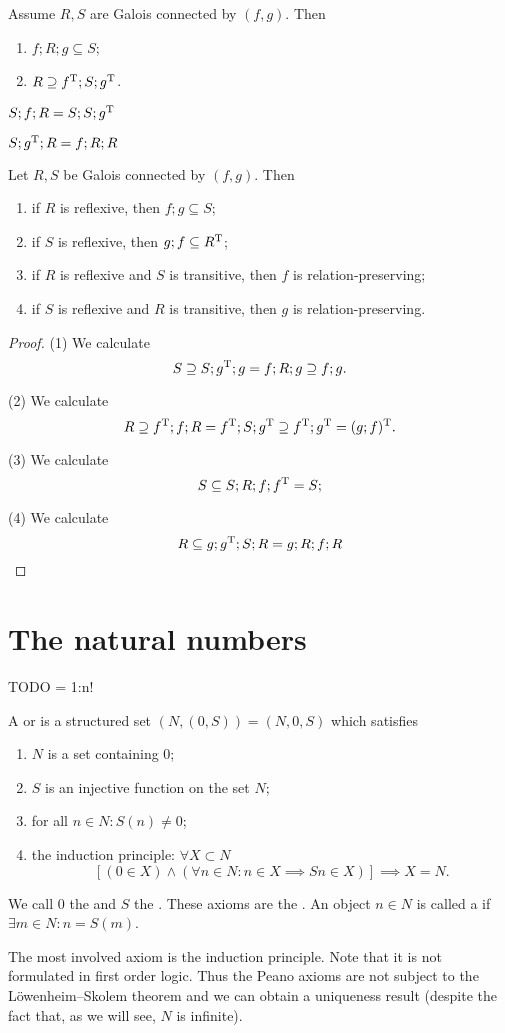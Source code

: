 \begin{corollary}
Assume $R,S$ are Galois connected by $(f,g)$. Then
\begin{enumerate}
\item $f;R;g \subseteq S$;
\item $R \supseteq f^{\mathrm{T}};S;g^{\mathrm{T}}$.
\end{enumerate}
\end{corollary}

$S;f;R = S;S;g^{\mathrm{T}}$

$S;g^{\mathrm{T}};R = f;R;R$

\begin{lemma}
Let $R, S$ be Galois connected by $(f,g)$. Then
\begin{enumerate}
\item if $R$ is reflexive, then $f;g \subseteq S$;
\item if $S$ is reflexive, then $g;f \subseteq R^{\mathrm{T}}$;
\item if $R$ is reflexive and $S$ is transitive, then $f$ is relation-preserving;
\item if $S$ is reflexive and $R$ is transitive, then $g$ is relation-preserving.
\end{enumerate}
\end{lemma}
\begin{proof}
(1) We calculate
\[ S \supseteq S;g^{\mathrm{T}};g = f;R;g \supseteq f;g.  \]

(2) We calculate
\[ R \supseteq f^{\mathrm{T}};f;R = f^{\mathrm{T}};S;g^{\mathrm{T}} \supseteq f^{\mathrm{T}};g^{\mathrm{T}} = (g;f)^{\mathrm{T}}. \]

(3) We calculate
\[ S \subseteq S;R;f;f^{\mathrm{T}} = S; \]

(4) We calculate
\[ R \subseteq g;g^{\mathrm{T}};S;R = g;R;f;R \]
\end{proof}

\chapter{The natural numbers}
TODO = 1:n!
\begin{definition}
A  or  is a structured set $(N,(0,S)) = (N,0,S)$ which satisfies
\begin{enumerate}
\item $N$ is a set containing $0$;
\item $S$ is an injective function on the set $N$;
\item for all $n\in N: S(n) \neq 0$;
\item the induction principle: $\forall X\subset N$
\[ [(0\in X) \land (\forall n\in N: n\in X \implies Sn \in X)] \implies X = N. \]
\end{enumerate}
We call $0$ the  and $S$ the . These axioms are the . An object $n\in N$ is called a  if $\exists m\in N: n = S(m)$.
\end{definition}
The most involved axiom is the induction principle. Note that it is not formulated in first order logic. Thus the Peano axioms are not subject to the Löwenheim–Skolem theorem and we can obtain a uniqueness result (despite the fact that, as we will see, $N$ is infinite).

